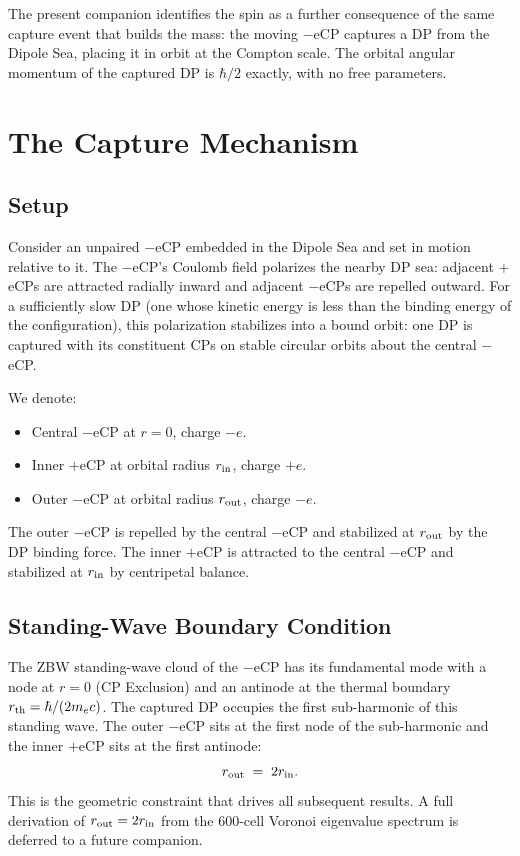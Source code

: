 \documentclass[12pt]{article}
\newcommand{\rin}{r_{\rm in}}
\newcommand{\rout}{r_{\rm out}}
\begin{document}
The present companion identifies the spin as a further consequence of
the same capture event that builds the mass: the moving $-$eCP captures
a DP from the Dipole Sea, placing it in orbit at the Compton scale.
The orbital angular momentum of the captured DP is $\hbar/2$ exactly,
with no free parameters.

\section{The Capture Mechanism}
\label{sec:capture}

\subsection{Setup}

Consider an unpaired $-$eCP embedded in the Dipole Sea and set in
motion relative to it.  The $-$eCP's Coulomb field polarizes the nearby
DP sea: adjacent $+$eCPs are attracted radially inward and adjacent
$-$eCPs are repelled outward.  For a sufficiently slow DP (one whose
kinetic energy is less than the binding energy of the configuration),
this polarization stabilizes into a bound orbit: one DP is captured
with its constituent CPs on stable circular orbits about the central
$-$eCP.

We denote:
\begin{itemize}[noitemsep]
  \item Central $-$eCP at $r = 0$, charge $-e$.
  \item Inner $+$eCP at orbital radius $\rin$, charge $+e$.
  \item Outer $-$eCP at orbital radius $\rout$, charge $-e$.
\end{itemize}

The outer $-$eCP is repelled by the central $-$eCP and stabilized at
$\rout$ by the DP binding force.  The inner $+$eCP is attracted to the
central $-$eCP and stabilized at $\rin$ by centripetal balance.

\subsection{Standing-Wave Boundary Condition}

The ZBW standing-wave cloud of the $-$eCP has its fundamental mode
with a node at $r = 0$ (CP Exclusion) and an antinode at the thermal
boundary $r_{\rm th} = \hbar/(2m_e c)$.  The captured DP occupies the
first sub-harmonic of this standing wave.  The outer $-$eCP sits at
the first node of the sub-harmonic and the inner $+$eCP sits at the
first antinode:
\begin{equation}
  \rout \;=\; 2\rin.
  \label{eq:rout}
\end{equation}
This is the geometric constraint that drives all subsequent results.  A
full derivation of $\rout = 2\rin$ from the 600-cell Voronoi eigenvalue
spectrum is deferred to a future companion.
\end{document}
